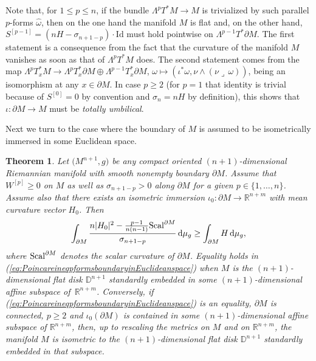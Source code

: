\documentclass[pdftex]{sigma}
\numberwithin{equation}{section}
\newtheorem{Theorem}{Theorem}[section]
\begin{document}
\begin{Remark}\label{r:LambdapTMtrivial} Note that, for $1\leq p\leq n$, if the bundle $\Lambda^p T^*M\to M$ is trivialized by such parallel $p$-forms $\hat{\omega}$, then on the one hand the manifold $M$ is flat and, on the other hand, $S^{[p-1]}=(nH-\sigma_{n+1-p})\cdot\mathrm{Id}$ must hold pointwise on $\Lambda^{p-1}T^*\partial M$.
The first statement is a consequence from the fact that the curvature of the manifold $M$ vanishes as soon as that of $\Lambda^p T^*M$ does.
The second statement comes from the map $\Lambda^p T_x^*M\to \Lambda^p T^*_x\partial M\oplus \Lambda^{p-1} T^*_x\partial M$, $\omega\mapsto (\iota^*\omega,\nu\wedge(\nu\lrcorner\,\omega))$, being an isomorphism at any $x\in \partial M$.  In case $p\geq2$ (for $p=1$ that identity is trivial because of $S^{[0]}=0$ by convention and $\sigma_{n}=nH$ by definition), this shows that $\iota\colon\partial M\to M$ must be \emph{totally umbilical}.
\end{Remark}

Next we turn to the case where the boundary of $M$ is assumed to be isometrically immersed in some Euclidean space.

\begin{Theorem}\label{t:PoincareineqpformsboundaryinEuclideanspace}
Let $\bigl(M^{n+1},g\bigr)$ be any compact oriented $(n+1)$-dimensional Riemannian manifold with smooth nonempty boundary $\partial M$.
Assume that $W^{[p]}\geq0$ on $M$ as well as $\sigma_{n+1-p}>0$ along $\partial M$ for a given $p\in\{1,\dots,n\}$.
Assume also that there exists an isometric immersion $\iota_0\colon\partial M\to\mathbb{R}^{n+m}$ with mean curvature vector $H_0$. Then
\begin{equation}\label{eq:PoincareineqpformsboundaryinEuclideanspace}
\int_{\partial M}\frac{n|H_0|^2-\frac{p-1}{n(n-1)}{\rm Scal}^{\partial M}}{\sigma_{n+1-p}}\,{\rm d}\mu_g\geq\int_{\partial M}H\,{\rm d}\mu_g,
\end{equation}
where  ${\rm Scal}^{\partial M}$  denotes the scalar curvature of $\partial M$. Equality holds in {\rm (\ref{eq:PoincareineqpformsboundaryinEuclideanspace})} when $M$ is the $(n+1)$-dimensional flat disk $\mathbb{D}^{n+1}$ standardly embedded in some $(n+1)$-dimensional affine subspace of~$\mathbb{R}^{n+m}$. Conversely, if {\rm (\ref{eq:PoincareineqpformsboundaryinEuclideanspace})} is an equality, $\partial M$ is connected, $p\geq 2$ and $\iota_0(\partial M)$ is contained in some $(n+1)$-dimensional affine subspace of $\mathbb{R}^{n+m}$, then, up to rescaling the metrics on $M$ and on $\mathbb{R}^{n+m}$, the manifold $M$ is isometric to the $(n+1)$-dimensional flat disk $\mathbb{D}^{n+1}$ standardly embedded in that subspace.
\end{Theorem}
\end{document}
